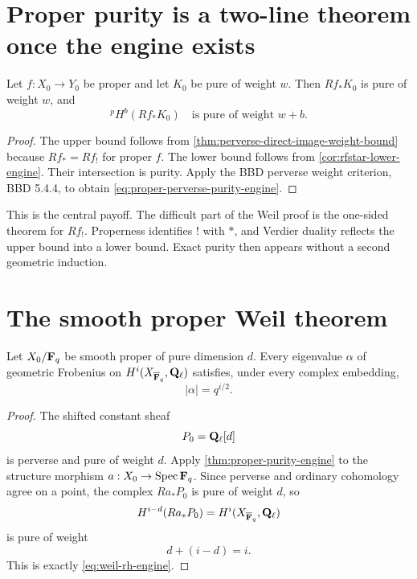 \section{Proper purity is a two-line theorem once the engine exists}

\begin{theorem}
\label{thm:proper-purity-engine}
Let \(f:X_0\to Y_0\) be proper and let \(K_0\) be pure of weight \(w\).
Then \(Rf_*K_0\) is pure of weight \(w\), and
\[
  {}^pH^b(Rf_*K_0)
  \quad\text{is pure of weight }w+b.
\tag{\thechapter.11}\label{eq:proper-perverse-purity-engine}
\]
\end{theorem}

\begin{proof}
The upper bound follows from
\cref{thm:perverse-direct-image-weight-bound} because
\(Rf_*=Rf_!\) for proper \(f\).  The lower bound follows from
\cref{cor:rfstar-lower-engine}.  Their intersection is purity.  Apply the
BBD perverse weight criterion, BBD 5.4.4, to obtain
\eqref{eq:proper-perverse-purity-engine}.
\end{proof}

\begin{powerbox}
This is the central payoff.  The difficult part of the Weil proof is the
one-sided theorem for \(Rf_!\).  Properness identifies \(!\) with \(*\), and
Verdier duality reflects the upper bound into a lower bound.  Exact purity
then appears without a second geometric induction.
\end{powerbox}

\section{The smooth proper Weil theorem}

\begin{theorem}
\label{thm:weil-rh-perverse-engine}
Let \(X_0/\mathbf F_q\) be smooth proper of pure dimension \(d\).  Every eigenvalue
\(\alpha\) of geometric Frobenius on
\(H^i(X_{\overline{\mathbf F}_q},\mathbf Q_\ell)\) satisfies, under every complex embedding,
\[
  |\alpha|=q^{i/2}.
\tag{\thechapter.12}\label{eq:weil-rh-engine}
\]
\end{theorem}

\begin{proof}
The shifted constant sheaf
\[
  P_0=\mathbf Q_\ell[d]
\]
is perverse and pure of weight \(d\).  Apply
\cref{thm:proper-purity-engine} to the structure morphism
\(a:X_0\to\operatorname{Spec}\mathbf F_q\).  Since perverse and ordinary cohomology agree on a
point, the complex \(Ra_*P_0\) is pure of weight \(d\), so
\[
 H^{i-d}(Ra_*P_0)=H^i(X_{\overline{\mathbf F}_q},\mathbf Q_\ell)
\]
is pure of weight
\[
  d+(i-d)=i.
\]
This is exactly \eqref{eq:weil-rh-engine}.
\end{proof}

